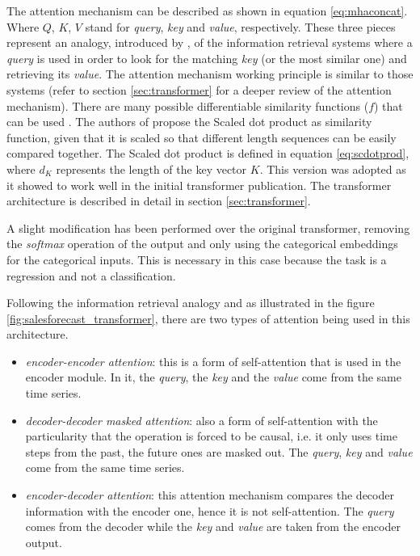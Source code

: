 The attention mechanism can be described as shown in equation \ref{eq:mhaconcat}. Where $Q$, $K$, $V$ stand for \textit{query}, \textit{key} and \textit{value}, respectively. These three pieces represent an analogy, introduced by \autocite{vaswani2017}, of the information retrieval systems where a \textit{query} is used in order to look for the matching \textit{key} (or the most similar one) and retrieving its \textit{value}. The attention mechanism working principle is similar to those systems (refer to section \ref{sec:transformer} for a deeper review of the attention mechanism). There are many possible differentiable similarity functions ($f$) that can be used \autocite{uday2019}. The authors of \autocite{vaswani2017} propose the Scaled dot product as similarity function, given that it is scaled so that different length sequences can be easily compared together. The Scaled dot product is defined in equation \ref{eq:scdotprod},  where $d_K$ represents the length of the key vector $K$. This version was adopted as it showed to work well in the initial transformer publication. The transformer architecture is described in detail in section \ref{sec:transformer}.

A slight modification has been performed over the original transformer, removing the \textit{softmax} operation of the output and only using the categorical embeddings for the categorical inputs. This is necessary in this case because the task is a regression and not a classification.

Following the information retrieval analogy and as illustrated in the figure \ref{fig:salesforecast_transformer}, there are two types of attention being used in this architecture.
\begin{itemize}
	\item \textit{encoder-encoder attention}: this is a form of self-attention that is used in the encoder module. In it, the \textit{query}, the \textit{key} and the \textit{value} come from the same time series.
	\item \textit{decoder-decoder masked attention}: also a form of self-attention with the particularity that the operation is forced to be causal, i.e. it only uses time steps from the past, the future ones are masked out. The \textit{query}, \textit{key} and \textit{value} come from the same time series.
	\item \textit{encoder-decoder attention}: this attention mechanism compares the decoder information with the encoder one, hence it is not self-attention. The \textit{query} comes from the decoder while the \textit{key} and \textit{value} are taken from the encoder output.
\end{itemize}

